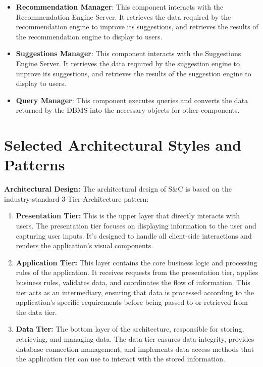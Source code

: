 \begin{itemize}
    \item \textbf{Recommendation Manager}: This component interacts with the Recommendation Engine Server. It retrieves the data
    required by the recommendation engine to improve its suggestions, and retrieves the results of the recommendation engine to display to users. 
    
    \item \textbf{Suggestions Manager}: This component interacts with the Suggestions Engine Server. It retrieves the data
    required by the suggestion engine to improve its suggestions, and retrieves the results of the suggestion engine to display to users.
    
    \item \textbf{Query Manager}: This component executes queries and converts the data returned by the DBMS into the necessary objects for other components.
\end{itemize}



\section{Selected Architectural Styles and Patterns}
\label{sec:selected-architectural-styles-patterns}%

\par{\textbf{Architectural Design:}} The architectural design of S\&C is based on the industry-standard 3-Tier-Architecture pattern:

\begin{enumerate}
      \item \textbf{Presentation Tier:} This is the upper layer that directly interacts with users. The presentation tier
            focuses on displaying information to the user and capturing user inputs. It's designed to handle all client-side
            interactions and renders the application's visual components.
      \item \textbf{Application Tier:} This layer contains the core business logic and processing rules of the
            application. It receives requests from the presentation tier, applies business rules, validates data, and
            coordinates the flow of information. This tier acts as an intermediary, ensuring that data is processed
            according to the application's specific requirements before being passed to or retrieved from the data tier.
      \item \textbf{Data Tier:} The bottom layer of the architecture, responsible for storing, retrieving, and managing
            data. The data tier ensures data integrity, provides database connection management, and implements data
            access methods that the application tier can use to interact with the stored information.
\end{enumerate}

